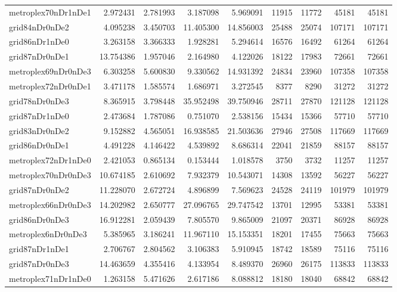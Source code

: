 \begin{longtable}{|l|r|r|r|r|r|r|r|r|}
metroplex70nDr1nDe1 & 2.972431 & 2.781993 & 3.187098 & 5.969091 & 11915 & 11772 & 45181 & 45181 \\
grid84nDr0nDe2 & 4.095238 & 3.450703 & 11.405300 & 14.856003 & 25488 & 25074 & 107171 & 107171 \\
grid86nDr1nDe0 & 3.263158 & 3.366333 & 1.928281 & 5.294614 & 16576 & 16492 & 61264 & 61264 \\
grid87nDr0nDe1 & 13.754386 & 1.957046 & 2.164980 & 4.122026 & 18122 & 17983 & 72661 & 72661 \\
metroplex69nDr0nDe3 & 6.303258 & 5.600830 & 9.330562 & 14.931392 & 24834 & 23960 & 107358 & 107358 \\
metroplex72nDr0nDe1 & 3.471178 & 1.585574 & 1.686971 & 3.272545 & 8377 & 8290 & 31272 & 31272 \\
grid78nDr0nDe3 & 8.365915 & 3.798448 & 35.952498 & 39.750946 & 28711 & 27870 & 121128 & 121128 \\
grid87nDr1nDe0 & 2.473684 & 1.787086 & 0.751070 & 2.538156 & 15434 & 15366 & 57710 & 57710 \\
grid83nDr0nDe2 & 9.152882 & 4.565051 & 16.938585 & 21.503636 & 27946 & 27508 & 117669 & 117669 \\
grid86nDr0nDe1 & 4.491228 & 4.146422 & 4.539892 & 8.686314 & 22041 & 21859 & 88157 & 88157 \\
metroplex72nDr1nDe0 & 2.421053 & 0.865134 & 0.153444 & 1.018578 & 3750 & 3732 & 11257 & 11257 \\
metroplex70nDr0nDe3 & 10.674185 & 2.610692 & 7.932379 & 10.543071 & 14308 & 13592 & 56227 & 56227 \\
grid87nDr0nDe2 & 11.228070 & 2.672724 & 4.896899 & 7.569623 & 24528 & 24119 & 101979 & 101979 \\
metroplex66nDr0nDe3 & 14.202982 & 2.650777 & 27.096765 & 29.747542 & 13701 & 12995 & 53381 & 53381 \\
grid86nDr0nDe3 & 16.912281 & 2.059439 & 7.805570 & 9.865009 & 21097 & 20371 & 86928 & 86928 \\
metroplex6nDr0nDe3 & 5.385965 & 3.186241 & 11.967110 & 15.153351 & 18201 & 17455 & 75663 & 75663 \\
grid87nDr1nDe1 & 2.706767 & 2.804562 & 3.106383 & 5.910945 & 18742 & 18589 & 75116 & 75116 \\
grid87nDr0nDe3 & 14.463659 & 4.355416 & 4.133954 & 8.489370 & 26960 & 26175 & 113833 & 113833 \\
metroplex71nDr1nDe0 & 1.263158 & 5.471626 & 2.617186 & 8.088812 & 18180 & 18040 & 68842 & 68842 \\

\end{longtable}
